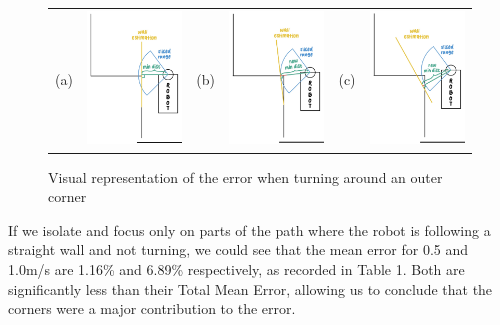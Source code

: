 \documentclass{article}
\begin{document}
\begin{figure}[h]
\begin{center}
\begin{tabular} {c c c c c c}
(a) & 
\includegraphics[width=.25\textwidth,trim={0 10cm 0 0},clip]{imgs/outer_corner_before.jpg} & 
(b) &
\includegraphics[width=.25\textwidth,trim={0 10cm 0 0},clip]{imgs/outer_corner_after.jpg} &
(c) & 
\includegraphics[width=.25\textwidth,trim={0 10cm 0 0},clip]{imgs/outer_corner_after_after.jpg} 
\end{tabular}
\caption{Visual representation of the error when turning around an outer corner}
\end{center}
\end{figure}

If we isolate and focus only on parts of the path where the robot is following a straight wall and not turning, we could see that the mean error for 0.5 and 1.0m/s are 1.16\% and 6.89\% respectively, as recorded in Table 1. Both are significantly less than their Total Mean Error, allowing us to conclude that the corners were a major contribution to the error. \\
\end{document}
